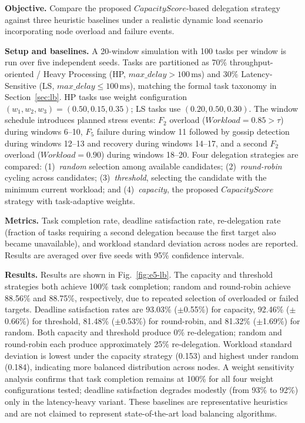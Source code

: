 \documentclass[conference]{IEEEtran}
\begin{document}
    \textbf{Objective.} Compare the proposed $CapacityScore$-based delegation strategy against three heuristic baselines under a realistic dynamic load scenario incorporating node overload and failure events.

    \textbf{Setup and baselines.} A 20-window simulation with 100 tasks per window is run over five independent seeds. Tasks are partitioned as 70\% throughput-oriented / Heavy Processing (HP, $max\_delay > 100\,\text{ms}$) and 30\% Latency-Sensitive (LS, $max\_delay \leq 100\,\text{ms}$), matching the formal task taxonomy in Section~\ref{sec:lb}. HP tasks use weight configuration $(w_1,w_2,w_3)=(0.50,0.15,0.35)$; LS tasks use $(0.20,0.50,0.30)$. The window schedule introduces planned stress events: $F_2$ overload ($Workload=0.85>\tau$) during windows 6--10, $F_5$ failure during window 11 followed by gossip detection during windows 12--13 and recovery during windows 14--17, and a second $F_2$ overload ($Workload=0.90$) during windows 18--20. Four delegation strategies are compared: (1)~\emph{random} selection among available candidates; (2)~\emph{round-robin} cycling across candidates; (3)~\emph{threshold}, selecting the candidate with the minimum current workload; and (4)~\emph{capacity}, the proposed $CapacityScore$ strategy with task-adaptive weights.

    \textbf{Metrics.} Task completion rate, deadline satisfaction rate, re-delegation rate (fraction of tasks requiring a second delegation because the first target also became unavailable), and workload standard deviation across nodes are reported. Results are averaged over five seeds with 95\% confidence intervals.

    \textbf{Results.} Results are shown in Fig.~\ref{fig:e5-lb}. The capacity and threshold strategies both achieve 100\% task completion; random and round-robin achieve 88.56\% and 88.75\%, respectively, due to repeated selection of overloaded or failed targets. Deadline satisfaction rates are 93.03\% ($\pm$0.55\%) for capacity, 92.46\% ($\pm$0.66\%) for threshold, 81.48\% ($\pm$0.53\%) for round-robin, and 81.32\% ($\pm$1.69\%) for random. Both capacity and threshold produce 0\% re-delegation; random and round-robin each produce approximately 25\% re-delegation. Workload standard deviation is lowest under the capacity strategy (0.153) and highest under random (0.184), indicating more balanced distribution across nodes. A weight sensitivity analysis confirms that task completion remains at 100\% for all four weight configurations tested; deadline satisfaction degrades modestly (from 93\% to 92\%) only in the latency-heavy variant. These baselines are representative heuristics and are not claimed to represent state-of-the-art load balancing algorithms.
\end{document}
